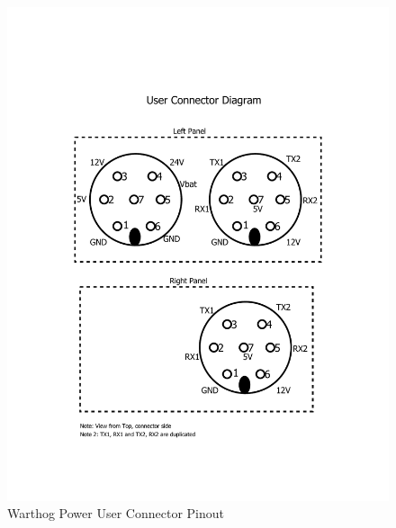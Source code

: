 \documentclass[]{clearpath-latex/clearpath-manual}
\begin{document}
\begin{figure}[!h]
  \centering
  \includegraphics[width=1.0\linewidth]{user-connector-diagram.pdf}
  \caption{Warthog Power User Connector Pinout}
  \label{userpowerpinout}
\end{figure}
\end{document}
